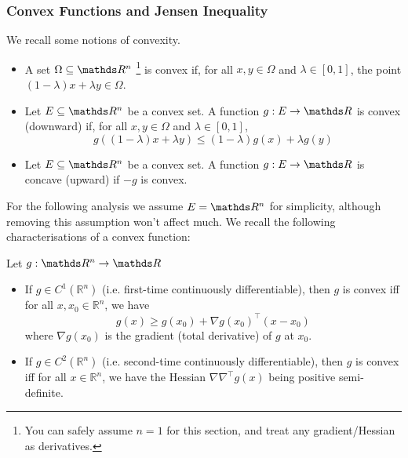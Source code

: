 \subsubsection{Convex Functions and Jensen Inequality}
We recall some notions of convexity.
\begin{definition}[Convexity] \phantom{blah\\}
\begin{itemize}
    \item A set $\Omega \subseteq \R^n$ \footnote{You can safely assume $n = 1$ for this section, and treat any gradient/Hessian as derivatives.} is convex if, for all $x,y \in \Omega$ and $\lambda \in [0,1]$, the point $(1-\lambda) x + \lambda y \in \Omega$.
    \item Let $E \subseteq \R^n$ be a convex set. A function $g:E \to \R$ is convex (downward) if, for all $x,y \in \Omega$ and $\lambda \in [0,1]$, 
    \begin{equation}
        g((1-\lambda) x + \lambda y) \leq (1-\lambda) g(x) + \lambda g(y)
    \end{equation}
    \item Let $E \subseteq \R^n$ be a convex set. A function $g:E\to \R$ is concave (upward) if $-g$ is convex.
\end{itemize}
\end{definition}

For the following analysis we assume $E = \R^n$ for simplicity, although removing this assumption won't affect much. We recall the following characterisations of a convex function:

\begin{proposition} Let $g:\R^n \to \R$
\begin{itemize}
    \item If $g \in C^1(\mathbb{R}^n)$ (i.e. first-time continuously differentiable), then $g$ is convex iff for all $x, x_0 \in \mathbb{R}^n$, we have
    \begin{equation}
        g(x) \geq g(x_0) + \nabla g(x_0)^\top (x - x_0) 
    \end{equation}
    where $\nabla g(x_0)$ is the gradient (total derivative) of $g$ at $x_0$.
    \item If $g \in C^2(\mathbb{R}^n)$ (i.e. second-time continuously differentiable), then $g$ is convex iff for all $x \in \mathbb{R}^n$, we have the Hessian $\nabla \nabla^\top g(x)$ being positive semi-definite.
\end{itemize}
\end{proposition}

